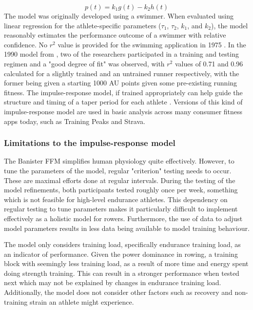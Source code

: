 \begin{equation}\label{eq:ban_perf}
  p(t) = k_1g(t)-k_2h(t)
\end{equation}
The model was originally developed using a swimmer. When evaluated using linear regression for the athlete-specific parameters ($\tau_1$, $\tau_2$, $k_1$, and $k_2$), the model reasonably estimates the performance outcome of a swimmer with relative confidence. No $r^2$ value is provided for the swimming application in 1975 \cite{Bannister1976}. In the 1990 model from \textcite{Morton1990}, two of the researchers participated in a training and testing regimen and a "good degree of fit" was observed, with $r^2$ values of 0.71 and 0.96 calculated for a slightly trained and an untrained runner respectively, with the former being given a starting 1000 AU points given some pre-existing running fitness. The impulse-response model, if trained appropriately can help guide the structure and timing of a taper period for each athlete \cite{Morton1990}.
Versions of this kind of impulse-response model are used in basic analysis across many consumer fitness apps today, such as Training Peaks and Strava.

\subsubsection{Limitations to the impulse-response model}
The Banister FFM simplifies human physiology quite effectively. However, to tune the parameters of the model, regular "criterion" testing needs to occur. These are maximal efforts done at regular intervals. During the testing of the \textcite{Morton1990} model refinements, both participants tested roughly once per week, something which is not feasible for high-level endurance athletes. This dependency on regular testing to tune parameters makes it particularly difficult to implement effectively as a holistic model for rowers. Furthermore, the use of data to adjust model parameters results in less data being available to model training behaviour.

The model only considers training load, specifically endurance training load, as an indicator of performance. Given the power dominance in rowing, a training block with seemingly less training load, as a result of more time and energy spent doing strength training. This can result in a stronger performance when tested next which may not be explained by changes in endurance training load. Additionally, the model does not consider other factors such as recovery and non-training strain an athlete might experience.

